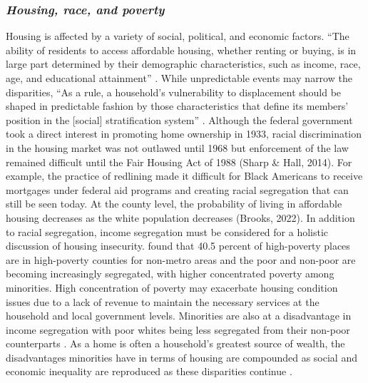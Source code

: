 \subsubsection{\textit{Housing, race, and poverty}}
Housing is affected by a variety of social, political, and economic factors. “The ability of residents to access affordable housing, whether renting or buying, is in large part determined by their demographic characteristics, such as income, race, age, and educational attainment” \citep[115]{yadavalli_comprehensive_2020}. While unpredictable events may narrow the disparities, “As a rule, a household’s vulnerability to displacement should be shaped in predictable fashion by those characteristics that define its members’ position in the [social] stratification system” \citep[5]{lee_forced_2020}. Although the federal government took a direct interest in promoting home ownership in 1933, racial discrimination in the housing market was not outlawed until 1968 but enforcement of the law remained difficult until the Fair Housing Act of 1988 (Sharp \& Hall, 2014). For example, the practice of redlining made it difficult for Black Americans to receive mortgages under federal aid programs and creating racial segregation that can still be seen today. At the county level, the probability of living in affordable housing decreases as the white population decreases (Brooks, 2022). In addition to racial segregation, income segregation must be considered for a holistic discussion of housing insecurity. \citet{lichter_rural_2011} found that 40.5 percent of high-poverty places are in high-poverty counties for non-metro areas and the poor and non-poor are becoming increasingly segregated, with higher concentrated poverty among minorities. High concentration of poverty may exacerbate housing condition issues due to a lack of revenue to maintain the necessary services at the household and local government levels. Minorities are also at a disadvantage in income segregation with poor whites being less segregated from their non-poor counterparts \citep{lichter_ruralurban_2021}. As a home is often a household's greatest source of wealth, the disadvantages minorities have in terms of housing are compounded as social and economic inequality are reproduced as these disparities continue \citep{krivo_housing_2004}.  


